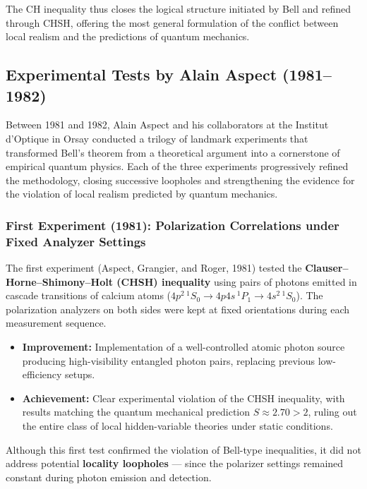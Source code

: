 The CH inequality thus closes the logical structure initiated by Bell and refined through CHSH, offering the most general formulation of the conflict between local realism and the predictions of quantum mechanics.

\subsection{Experimental Tests by Alain Aspect (1981–1982)}

Between 1981 and 1982, Alain Aspect and his collaborators at the Institut d’Optique in Orsay conducted a trilogy of landmark experiments that transformed Bell’s theorem from a theoretical argument into a cornerstone of empirical quantum physics.  
Each of the three experiments progressively refined the methodology, closing successive loopholes and strengthening the evidence for the violation of local realism predicted by quantum mechanics.

\subsubsection{First Experiment (1981): Polarization Correlations under Fixed Analyzer Settings}

The first experiment (Aspect, Grangier, and Roger, 1981) tested the \textbf{Clauser–Horne–Shimony–Holt (CHSH) inequality} using pairs of photons emitted in cascade transitions of calcium atoms ($4p^2\,^1S_0 \rightarrow 4p4s\,^1P_1 \rightarrow 4s^2\,^1S_0$).  
The polarization analyzers on both sides were kept at fixed orientations during each measurement sequence.

\begin{itemize}
    \item \textbf{Improvement:} Implementation of a well-controlled atomic photon source producing high-visibility entangled photon pairs, replacing previous low-efficiency setups.
    \item \textbf{Achievement:} Clear experimental violation of the CHSH inequality, with results matching the quantum mechanical prediction $S \approx 2.70 > 2$, ruling out the entire class of local hidden-variable theories under static conditions.
\end{itemize}

Although this first test confirmed the violation of Bell-type inequalities, it did not address potential \textbf{locality loopholes} — since the polarizer settings remained constant during photon emission and detection.

